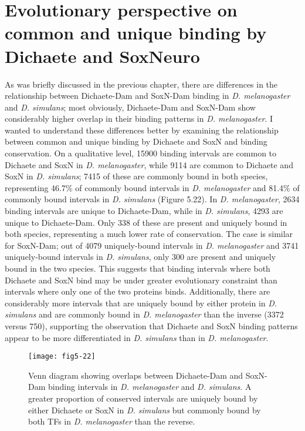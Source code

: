 \section{Evolutionary perspective on common and unique binding by Dichaete and SoxNeuro}
As was briefly discussed in the previous chapter, there are differences in the relationship between Dichaete-Dam and SoxN-Dam binding in \emph{D. melanogaster} and \emph{D. simulans}; most obviously, Dichaete-Dam and SoxN-Dam show considerably higher overlap in their binding patterns in \emph{D. melanogaster}. I wanted to understand these differences better by examining the relationship between common and unique binding by Dichaete and SoxN and binding conservation. On a qualitative level, 15900 binding intervals are common to Dichaete and SoxN in \emph{D. melanogaster}, while 9114 are common to Dichaete and SoxN in \emph{D. simulans}; 7415 of these are commonly bound in both species, representing 46.7\% of commonly bound intervals in \emph{D. melanogaster} and 81.4\% of commonly bound intervals in \emph{D. simulans} (Figure 5.22). In \emph{D. melanogaster}, 2634 binding intervals are unique to Dichaete-Dam, while in \emph{D. simulans}, 4293 are unique to Dichaete-Dam. Only 338 of these are present and uniquely bound in both species, representing a much lower rate of conservation. The case is similar for SoxN-Dam; out of 4079 uniquely-bound intervals in \emph{D. melanogaster} and 3741 uniquely-bound intervals in \emph{D. simulans}, only 300 are present and uniquely bound in the two species. This suggests that binding intervals where both Dichaete and SoxN bind may be under greater evolutionary constraint than intervals where only one of the two proteins binds. Additionally, there are considerably more intervals that are uniquely bound by either protein in \emph{D. simulans} and are commonly bound in \emph{D. melanogaster} than the inverse (3372 versus 750), supporting the observation that Dichaete and SoxN binding patterns appear to be more differentiated in \emph{D. simulans} than in \emph{D. melanogaster}.

\begin{figure}
\centering
\texttt{[image: fig5-22]}
\caption[Overlaps between Dichaete-Dam and SoxN-Dam binding intervals in \emph{D. melanogaster} and \emph{D. simulans}]{Venn diagram showing overlaps between Dichaete-Dam and SoxN-Dam binding intervals in \emph{D. melanogaster} and \emph{D. simulans}. A greater proportion of conserved intervals are uniquely bound by either Dichaete or SoxN in \emph{D. simulans} but commonly bound by both TFs in \emph{D. melanogaster} than the reverse.}
\label{Figure 5.22}
\end{figure}

